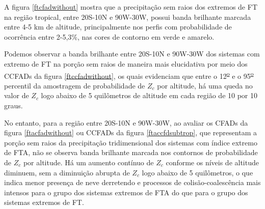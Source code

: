 


A figura \ref{ftcfadwithout} mostra que a precipitação sem raios dos extremos de FT na região tropical, entre 20S-10N e 90W-30W, possui banda brilhante marcada entre 4-5 km de altitude, principalmente nos perfis com probabilidade de ocorrência entre 2-5,3\%, nas cores de contorno em verde e amarelo. 

Podemos observar a banda brilhante entre 20S-10N e 90W-30W  dos sistemas com  extremo de FT na porção sem raios de maneira mais elucidativa por meio dos CCFADs da figura \ref{ftccfadwithout}, os quais evidenciam que entre o 12\textsuperscript{\underline{o}} e o 95\textsuperscript{\underline{o}} percentil da amostragem de probabilidade de $Z_c$ por altitude, há uma queda no valor de $Z_c$ logo abaixo de 5 quilômetros de altitude em cada região de 10 por 10 graus. 

No entanto, para a região entre 20S-10N e 90W-30W, ao avaliar os CFADs da figura \ref{ftacfadwithout} ou CCFADs da figura \ref{ftaccfdsubtrop}, que representam a porção sem raios da precipitação tridimensional dos sistemas com índice extremo de FTA, não se observa banda brilhante marcada nos contornos de probabilidade de $Z_c$ por altitude. Há um aumento contínuo de $Z_c$ conforme os níveis de altitude diminuem, sem a diminuição abrupta de $Z_c$ logo abaixo de 5 quilômetros, o que indica menor presença de neve derretendo e processos de colisão-coalescência mais intensos para o grupo dos sistemas extremos de FTA do que para o grupo dos sistemas extremos de FT. 



